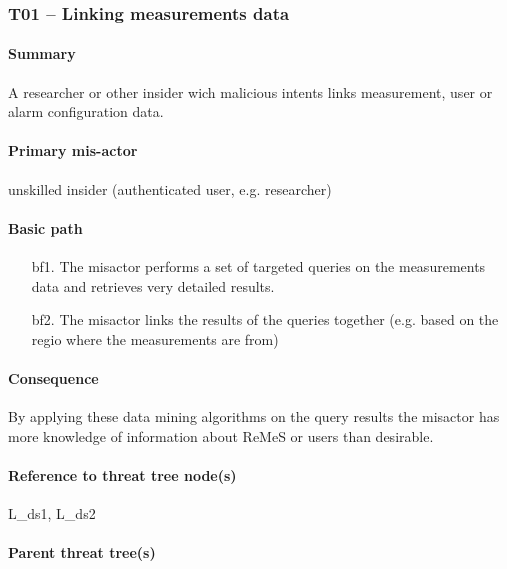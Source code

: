 \subsubsection{T01 -- Linking measurements data}
\label{threats:t01}

\paragraph{Summary}

\npar A researcher or other insider wich malicious intents links measurement,
user or alarm configuration data.

\paragraph{Primary mis-actor}

\npar unskilled insider (authenticated user, e.g. researcher)

\paragraph{Basic path}
\begin{enumerate}
	\item[bf1.] The misactor performs a set of targeted queries on the
	measurements data and retrieves very detailed results.
    \item[bf2.] The misactor links the results of the queries together (e.g.
    based on the regio where the measurements are from)
\end{enumerate}

\paragraph{Consequence}

\npar By applying these data mining algorithms on the query results the misactor
has more knowledge of information about ReMeS or users than desirable. 

\paragraph{Reference to threat tree node(s)} 

L\_ds1, L\_ds2


\paragraph{Parent threat tree(s)}

